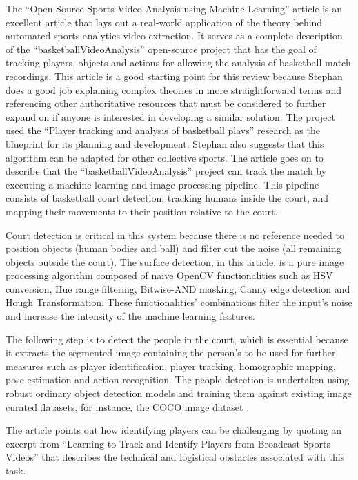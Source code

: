 \documentclass[
    11pt,
    oneside
]{report}
\begin{document}
The ``Open Source Sports Video Analysis using Machine Learning'' article \cite{stephan} is an excellent article that lays out a real-world application of the theory behind automated sports analytics video extraction. It serves as a complete description of the ``basketballVideoAnalysis'' open-source project \cite{stephan_code} that has the goal of tracking players, objects and actions for allowing the analysis of basketball match recordings. This article is a good starting point for this review because Stephan does a good job explaining complex theories in more straightforward terms and referencing other authoritative resources that must be considered to further expand on if anyone is interested in developing a similar solution. The project used the ``Player tracking and analysis of basketball plays'' \cite{baskettrack} research as the blueprint for its planning and development. Stephan also suggests that this algorithm can be adapted for other collective sports. The article \cite{stephan} goes on to describe that the ``basketballVideoAnalysis'' project can track the match by executing a machine learning and image processing pipeline. This pipeline consists of basketball court detection, tracking humans inside the court, and mapping their movements to their position relative to the court.


Court detection is critical in this system because there is no reference needed to position objects (human bodies and ball) and filter out the noise (all remaining objects outside the court). The surface detection, in this article, is a pure image processing algorithm composed of naive OpenCV \cite{opencv} functionalities such as HSV conversion, Hue range filtering, Bitwise-AND masking, Canny edge detection and Hough Transformation. These functionalities' combinations filter the input's noise and increase the intensity of the machine learning features.


The following step is to detect the people in the court, which is essential because it extracts the segmented image containing the person's to be used for further measures such as player identification, player tracking, homographic mapping, pose estimation and action recognition. The people detection is undertaken using robust ordinary object detection models and training them against existing image curated datasets, for instance, the COCO image dataset \cite{cocodataset}.


The article points out how identifying players can be challenging by quoting an excerpt from ``Learning to Track and Identify Players from Broadcast Sports Videos'' \cite{learn_track_id} that describes the technical and logistical obstacles associated with this task.
\end{document}
